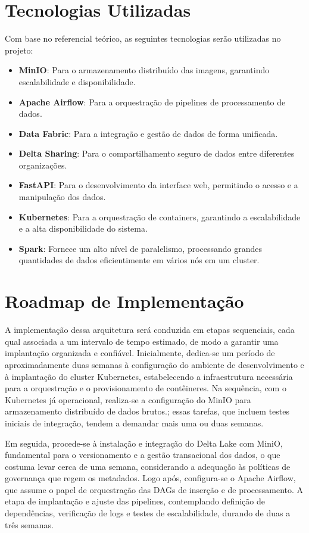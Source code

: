 \section{Tecnologias Utilizadas}

Com base no referencial teórico, as seguintes tecnologias serão utilizadas no projeto:
\begin{itemize}
    \item \textbf{MinIO}: Para o armazenamento distribuído das imagens, garantindo escalabilidade e disponibilidade.
    \item \textbf{Apache Airflow}: Para a orquestração de pipelines de processamento de dados.
    \item \textbf{Data Fabric}: Para a integração e gestão de dados de forma unificada.
    \item \textbf{Delta Sharing}: Para o compartilhamento seguro de dados entre diferentes organizações.
    \item \textbf{FastAPI}: Para o desenvolvimento da interface web, permitindo o acesso e a manipulação dos dados.
    \item \textbf{Kubernetes}: Para a orquestração de containers, garantindo a escalabilidade e a alta disponibilidade do sistema.
    \item \textbf{Spark}: Fornece um alto nível de paralelismo, processando grandes quantidades de dados eficientimente em vários nós em um cluster.
\end{itemize}

\section{Roadmap de Implementação}

A implementação dessa arquitetura será conduzida em etapas sequenciais, cada qual associada a um intervalo de tempo estimado, de modo a garantir uma implantação organizada e confiável. Inicialmente, dedica-se um período de aproximadamente duas semanas à configuração do ambiente de desenvolvimento e à implantação do cluster Kubernetes, estabelecendo a infraestrutura necessária para a orquestração e o provisionamento de contêineres. Na sequência, com o Kubernetes já operacional, realiza-se a configuração do MinIO para armazenamento distribuído de dados brutos.; essas tarefas, que incluem testes iniciais de integração, tendem a demandar mais uma ou duas semanas.

Em seguida, procede-se à instalação e integração do Delta Lake com MiniO, fundamental para o versionamento e a gestão transacional dos dados, o que costuma levar cerca de uma semana, considerando a adequação às políticas de governança que regem os metadados. Logo após, configura-se o Apache Airflow, que assume o papel de orquestração das DAGs de inserção e de processamento. A etapa de implantação e ajuste das pipelines, contemplando definição de dependências, verificação de logs e testes de escalabilidade, durando de duas a três semanas.

